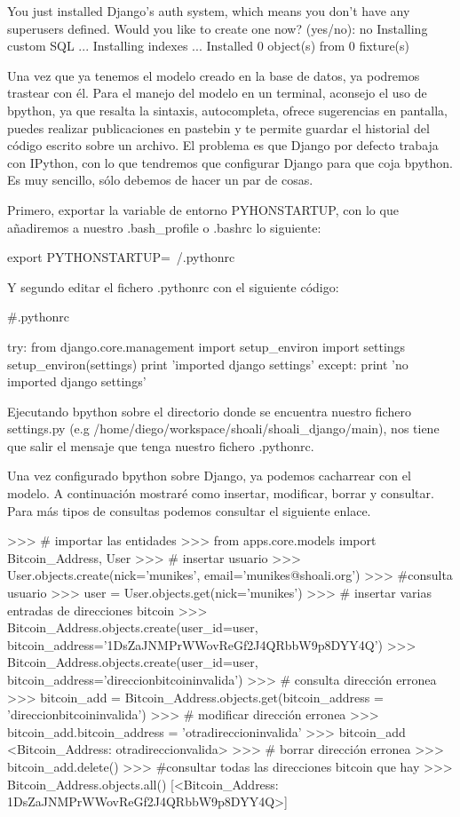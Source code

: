 \documentclass[a4paper, 12pt]{book}
\begin{document}
You just installed Django's auth system, which means you don't have any superusers defined.
Would you like to create one now? (yes/no): no
Installing custom SQL ...
Installing indexes ...
Installed 0 object(s) from 0 fixture(s)

Una vez que ya tenemos el modelo creado en la base de datos, ya podremos trastear con él. Para el manejo del modelo en un terminal, aconsejo el uso de bpython, ya que resalta la sintaxis, autocompleta, ofrece sugerencias en pantalla, puedes realizar publicaciones en pastebin y te permite guardar el historial del código escrito sobre un archivo. El problema es que Django por defecto trabaja con IPython, con lo que tendremos que configurar Django para que coja bpython. Es muy sencillo, sólo debemos de hacer un par de cosas.

Primero, exportar la variable de entorno  PYHONSTARTUP, con lo que añadiremos a nuestro .bash_profile o .bashrc lo siguiente:

export PYTHONSTARTUP=~/.pythonrc

Y segundo editar el fichero .pythonrc con el siguiente código:


#.pythonrc
 
try:
  from django.core.management import setup_environ
  import settings
  setup_environ(settings)
  print 'imported django settings'
except:
  print 'no imported django settings'

Ejecutando bpython sobre el directorio donde se encuentra nuestro fichero settings.py (e.g /home/diego/workspace/shoali/shoali_django/main), nos tiene que salir el mensaje que tenga nuestro fichero .pythonrc.

Una vez configurado bpython sobre Django, ya podemos cacharrear con el modelo. A continuación mostraré como insertar, modificar, borrar y consultar. Para más tipos de consultas podemos consultar el siguiente enlace.

>>> # importar las entidades
>>> from apps.core.models import Bitcoin_Address, User
>>> # insertar usuario
>>> User.objects.create(nick='munikes', email='munikes@shoali.org')
>>> #consulta usuario
>>> user = User.objects.get(nick='munikes')
>>> # insertar varias entradas de direcciones bitcoin
>>> Bitcoin_Address.objects.create(user_id=user, bitcoin_address='1DsZaJNMPrWWovReGf2J4QRbbW9p8DYY4Q')
>>> Bitcoin_Address.objects.create(user_id=user, bitcoin_address='direccionbitcoininvalida')
>>> # consulta dirección erronea
>>> bitcoin_add = Bitcoin_Address.objects.get(bitcoin_address = 'direccionbitcoininvalida')
>>> # modificar dirección erronea
>>> bitcoin_add.bitcoin_address = 'otradireccioninvalida'
>>> bitcoin_add
<Bitcoin_Address: otradireccionvalida>
>>> # borrar dirección erronea
>>> bitcoin_add.delete()
>>> #consultar todas las direcciones bitcoin que hay
>>> Bitcoin_Address.objects.all()
[<Bitcoin_Address: 1DsZaJNMPrWWovReGf2J4QRbbW9p8DYY4Q>]
\end{document}
